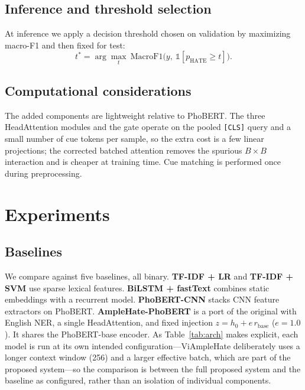\documentclass[11pt]{article}
\begin{document}
\subsection{Inference and threshold selection}
At inference we apply a decision threshold chosen on validation by maximizing macro-F1 and then fixed for test:
\begin{equation}
  t^{*} = \arg\max_t\ \mathrm{MacroF1}\big(y,\ \mathbb{1}[p_{\mathrm{HATE}}\ge t]\big).
\end{equation}

\subsection{Computational considerations}
The added components are lightweight relative to PhoBERT. The three HeadAttention modules and the gate operate on the pooled \texttt{[CLS]} query and a small number of cue tokens per sample, so the extra cost is a few linear projections; the corrected batched attention removes the spurious $B\times B$ interaction and is cheaper at training time. Cue matching is performed once during preprocessing.

\section{Experiments}

\subsection{Baselines}
We compare against five baselines, all binary. \textbf{TF-IDF + LR} and \textbf{TF-IDF + SVM} use sparse lexical features. \textbf{BiLSTM + fastText} \citep{fasttext} combines static embeddings with a recurrent model. \textbf{PhoBERT-CNN} stacks CNN feature extractors on PhoBERT. \textbf{AmpleHate-PhoBERT} is a port of the original with English NER, a single HeadAttention, and fixed injection $z=h_0+e\,r_{\mathrm{base}}$ ($e=1.0$). It shares the PhoBERT-base encoder. As Table~\ref{tab:arch} makes explicit, each model is run at its own intended configuration---ViAmpleHate deliberately uses a longer context window (256) and a larger effective batch, which are part of the proposed system---so the comparison is between the full proposed system and the baseline as configured, rather than an isolation of individual components.
\end{document}
